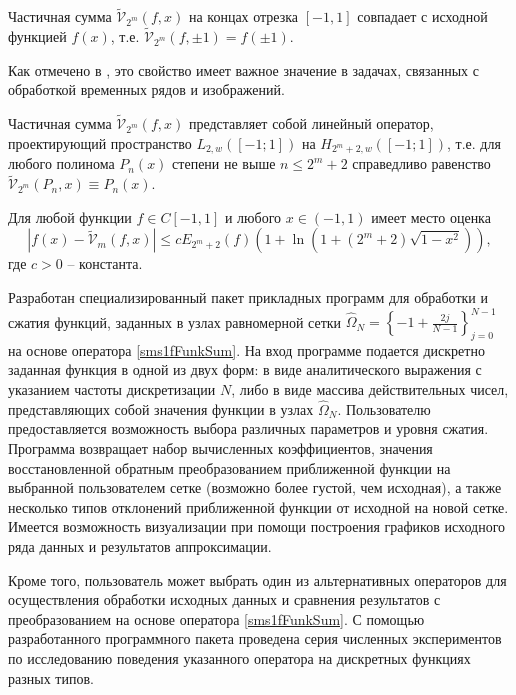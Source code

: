 \begin{theorem} \label{sms_th1}
  Частичная сумма $\tilde{\mathcal{V}}_{2^m}(f,x)$ на концах отрезка $[-1,1]$ совпадает с исходной функцией $f(x)$, т.е. $\tilde{\mathcal{V}}_{2^m}(f,\pm1) = f(\pm1)$.
\end{theorem}

\noindent Как отмечено в \cite{sms13},
это свойство имеет важное значение в задачах, связанных с обработкой временных рядов и изображений.

\begin{theorem} \label{sms_th2}
  Частичная сумма $\tilde{\mathcal{V}}_{2^m}(f,x)$ представляет собой линейный оператор, проектирующий пространство $L_{2, w}([-1; 1])$ на $H_{2^m+2, w}([-1; 1])$, т.е. для любого полинома $P_n(x)$ степени не выше $n\le 2^{m}+2$ справедливо равенство $\tilde{\mathcal{V}}_{2^m}(P_n,x) \equiv P_n(x)$.
\end{theorem}


\begin{theorem} \label{sms_th3}
  Для любой функции $f\in C[-1,1]$ и любого $x \in (-1, 1)$ имеет место оценка
\begin{equation*}
\label{sms1thrm3eq}
|f(x)-\tilde{\mathcal{V}}_m(f,x)|\le c E_{2^{m}+2}(f)(1+\ln(1+(2^{m}+2)\sqrt{1-x^2})),
\end{equation*}
где $c >0$ -- константа.
\end{theorem}




Разработан специализированный пакет прикладных программ для обработки и сжатия функций, заданных в узлах равномерной сетки
$\hat{\Omega}_N = \left\{ -1 + \frac{2 j}{N-1} \right\}_{j=0}^{N-1}$ на основе оператора \eqref{sms1fFunkSum}.
На вход программе подается дискретно заданная функция в одной из двух форм: в виде аналитического выражения с указанием частоты дискретизации $N$, либо в виде массива действительных чисел, представляющих собой значения функции в узлах $\hat{\Omega}_N$.
Пользователю предоставляется возможность выбора различных параметров и уровня сжатия.
Программа возвращает набор вычисленных коэффициентов, значения восстановленной обратным преобразованием приближенной функции на выбранной пользователем сетке (возможно более густой, чем исходная), а также несколько типов отклонений приближенной функции от исходной на новой сетке.
Имеется возможность визуализации при помощи построения графиков исходного ряда данных и результатов аппроксимации.

Кроме того, пользователь может выбрать один из альтернативных операторов для осуществления обработки исходных данных и сравнения результатов с преобразованием на основе оператора \eqref{sms1fFunkSum}.
С помощью разработанного программного пакета проведена серия численных экспериментов по исследованию поведения указанного оператора на дискретных функциях разных типов.
